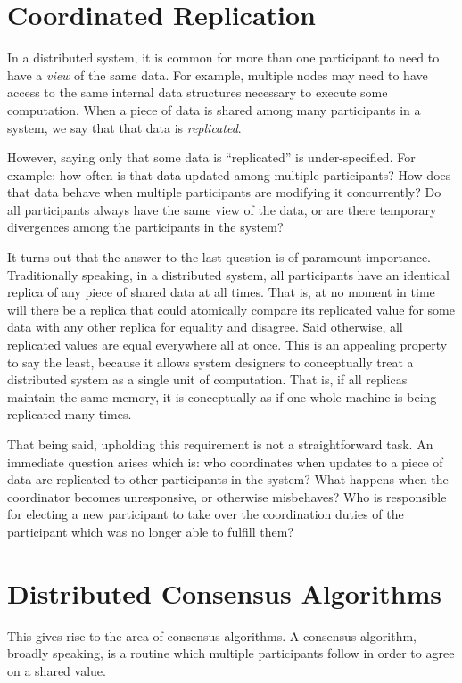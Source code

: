 \section{Coordinated Replication}
In a distributed system, it is common for more than one participant to need to
have a \textit{view} of the same data. For example, multiple nodes may need to
have access to the same internal data structures necessary to execute some
computation. When a piece of data is shared among many participants in a system,
we say that that data is \textit{replicated}.

However, saying only that some data is ``replicated'' is under-specified. For
example: how often is that data updated among multiple participants? How does
that data behave when multiple participants are modifying it concurrently? Do
all participants always have the same view of the data, or are there temporary
divergences among the participants in the system?

It turns out that the answer to the last question is of paramount importance.
Traditionally speaking, in a distributed system, all participants have an
identical replica of any piece of shared data at all times. That is, at no
moment in time will there be a replica that could atomically compare its
replicated value for some data with any other replica for equality and disagree.
Said otherwise, all replicated values are equal everywhere all at once. This is
an appealing property to say the least, because it allows system designers to
conceptually treat a distributed system as a single unit of computation. That
is, if all replicas maintain the same memory, it is conceptually as if one whole
machine is being replicated many times.

That being said, upholding this requirement is not a straightforward task. An
immediate question arises which is: who coordinates when updates to a piece of
data are replicated to other participants in the system? What happens when the
coordinator becomes unresponsive, or otherwise misbehaves? Who is responsible
for electing a new participant to take over the coordination duties of the
participant which was no longer able to fulfill them?

\section{Distributed Consensus Algorithms}
\label{sec:dca-safety}

This gives rise to the area of consensus algorithms. A consensus algorithm,
broadly speaking, is a routine which multiple participants follow in order to
agree on a shared value.

